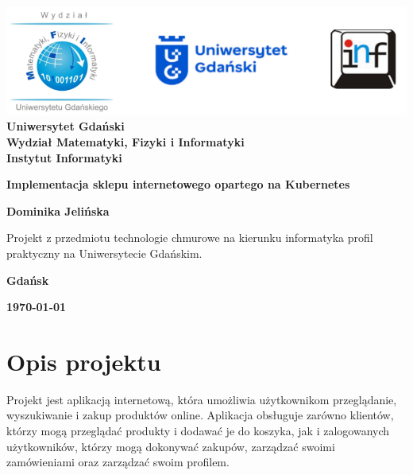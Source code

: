 \documentclass[12pt,a4paper]{article}
\newcommand{\hmwkTitle}{Implementacja sklepu internetowego opartego na Kubernetes}
\newcommand{\hmwkDueDate}{\today}
\newcommand{\hmwkAuthorName}{Dominika Jelińska}
\begin{document}
\begin{titlepage}
    \vfill
	\begin{center}
	\hspace*{-1cm}
	\vspace*{0.5cm}
    \includegraphics[scale=0.55]{imagens/loga.png}\\
	\textbf{Uniwersytet Gdański \\ [0.05cm]Wydział Matematyki, Fizyki i Informatyki \\ [0.05cm] Instytut Informatyki}

	\vspace{0.6cm}
	\vspace{4cm}
	{\huge \textbf{\hmwkTitle}}\vspace{8mm}
	
	{\large \textbf{\hmwkAuthorName}}\\[3cm]
	
		\hspace{.45\textwidth} %
	   \begin{minipage}{.5\textwidth}
	   Projekt z przedmiotu technologie chmurowe na kierunku informatyka profil praktyczny na Uniwersytecie Gdańskim.\\[0.1cm]
	  \end{minipage}
	  \vfill
	
	\textbf{Gdańsk}
	
	\textbf{\hmwkDueDate}
	\end{center}
	
\end{titlepage}

\newpage
\setcounter{secnumdepth}{5}
\tableofcontents
\newpage

\section{Opis projektu}
\label{sec:Project}

Projekt jest aplikacją internetową, która umożliwia użytkownikom przeglądanie, wyszukiwanie i zakup produktów online. Aplikacja obsługuje zarówno klientów, którzy mogą przeglądać produkty i dodawać je do koszyka, jak i zalogowanych użytkowników, którzy mogą dokonywać zakupów, zarządzać swoimi zamówieniami oraz zarządzać swoim profilem.
\end{document}
